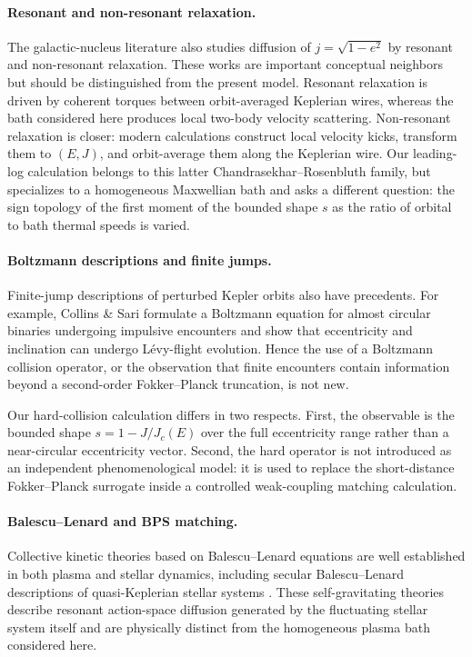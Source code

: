 \documentclass[11pt]{article}
\theoremstyle{remark}
\newcommand{\1}{\mathbf 1}
\begin{document}
\paragraph{Resonant and non-resonant relaxation.}
The galactic-nucleus literature also studies diffusion of
$j=\sqrt{1-e^2}$ by resonant and non-resonant relaxation.  These works are
important conceptual neighbors but should be distinguished from the present
model.  Resonant relaxation is driven by coherent torques between
orbit-averaged Keplerian wires, whereas the bath considered here produces
local two-body velocity scattering.  Non-resonant relaxation is closer:
modern calculations construct local velocity kicks, transform them to
$(E,J)$, and orbit-average them along the Keplerian wire.  Our leading-log
calculation belongs to this latter Chandrasekhar--Rosenbluth family, but
specializes to a homogeneous Maxwellian bath and asks a different question:
the sign topology of the first moment of the bounded shape $s$ as the ratio
of orbital to bath thermal speeds is varied.

\paragraph{Boltzmann descriptions and finite jumps.}
Finite-jump descriptions of perturbed Kepler orbits also have precedents.
For example, Collins \& Sari \cite{CollinsSari2008} formulate a Boltzmann equation for almost
circular binaries undergoing impulsive encounters and show that eccentricity
and inclination can undergo L\'evy-flight evolution.  Hence the use of a
Boltzmann collision operator, or the observation that finite encounters
contain information beyond a second-order Fokker--Planck truncation, is not
new.

Our hard-collision calculation differs in two respects.  First, the observable
is the bounded shape $s=1-J/J_c(E)$ over the full eccentricity range rather
than a near-circular eccentricity vector.  Second, the hard operator is not
introduced as an independent phenomenological model: it is used to replace
the short-distance Fokker--Planck surrogate inside a controlled weak-coupling
matching calculation.

\paragraph{Balescu--Lenard and BPS matching.}
Collective kinetic theories based on Balescu--Lenard equations
\cite{Lenard1960,Balescu1960} are well established in both plasma and stellar dynamics, including secular
Balescu--Lenard descriptions of quasi-Keplerian stellar systems
\cite{FouvryPichonMagorrian2017}.  These
self-gravitating theories describe resonant action-space diffusion generated
by the fluctuating stellar system itself and are physically distinct from
the homogeneous plasma bath considered here.
\end{document}
